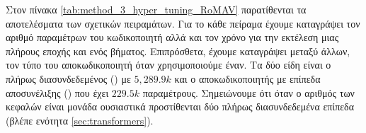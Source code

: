 Στον πίνακα \ref{tab:method_3_hyper_tuning_RoMAV} παρατίθενται τα αποτελέσματα των σχετικών πειραμάτων. Για το κάθε πείραμα έχουμε καταγράψει τον αριθμό παραμέτρων του κωδικοποιητή αλλά και τον χρόνο για την εκτέλεση μιας πλήρους εποχής και ενός βήματος. Επιπρόσθετα, έχουμε καταγράψει μεταξύ άλλων, τον τύπο του αποκωδικοποιητή όταν χρησιμοποιούμε έναν. Τα δύο είδη είναι ο πλήρως διασυνδεδεμένος () με $5,289.9k$ και ο αποκωδικοποιητής με επίπεδα αποσυνέλιξης () που έχει $229.5k$ παραμέτρους. Σημειώνουμε ότι όταν ο αριθμός των κεφαλών είναι μονάδα ουσιαστικά προστίθενται δύο πλήρως διασυνδεδεμένα επίπεδα (βλέπε ενότητα \ref{sec:transformers}).

\begin{table}[h]
    \begin{center}
    \end{center}
    \caption[]{\label{tab:method_3_hyper_tuning_RoMAV}Αποτελέσματα πειραμάτων για την εύρεση των βέλτιστων υπερπαραμέτρων του αλγορίθμου  αρχιτεκτονικής  στο σύνολο δεδομένων . Τα πειράματα αυτά πραγματοποιήθηκαν για 30 εποχές με μέγεθος δέσμης ίσο με 8.} 
\end{table}

